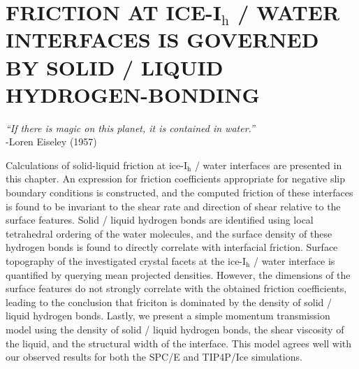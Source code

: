 \chapter{FRICTION AT ICE-I$_\mathrm{h}$ / WATER INTERFACES IS GOVERNED
  BY SOLID / LIQUID HYDROGEN-BONDING}\label{chap:Friction}


\begin{flushright}
\textit{``If there is magic on this planet, it is contained in water.''} \\
-Loren Eiseley (1957) \\
\end{flushright}


Calculations of solid-liquid friction at ice-I$_\mathrm{h}$ / water
interfaces are presented in this chapter.  An expression for friction
coefficients appropriate for negative slip boundary conditions is
constructed, and the computed friction of these interfaces is found to
be invariant to the shear rate and direction of shear relative to the
surface features. Solid / liquid hydrogen bonds are identified using
local tetrahedral ordering of the water molecules, and the surface
density of these hydrogen bonds is found to directly correlate with
interfacial friction. Surface topography of the investigated crystal
facets at the ice-I$_\mathrm{h}$ / water interface is quantified by
querying mean projected densities. However, the dimensions of the
surface features do not strongly correlate with the obtained friction
coefficients, leading to the conclusion that friciton is dominated by
the density of solid / liquid hydrogen bonds.  Lastly, we present a
simple momentum transmission model using the density of solid / liquid
hydrogen bonds, the shear viscosity of the liquid, and the structural
width of the interface. This model agrees well with our observed
results for both the SPC/E and TIP4P/Ice simulations.



